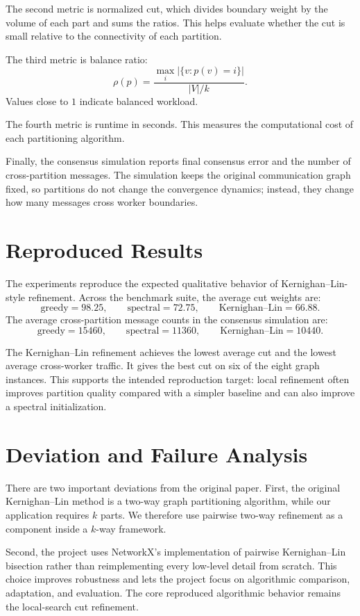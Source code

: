 \documentclass[11pt]{article}
\begin{document}
The second metric is normalized cut, which divides boundary weight by the
volume of each part and sums the ratios. This helps evaluate whether the cut is
small relative to the connectivity of each partition.

The third metric is balance ratio:
\[
    \rho(p)=
    \frac{\max_i |\{v:p(v)=i\}|}{|V|/k}.
\]
Values close to $1$ indicate balanced workload.

The fourth metric is runtime in seconds. This measures the computational cost
of each partitioning algorithm.

Finally, the consensus simulation reports final consensus error and the number
of cross-partition messages. The simulation keeps the original communication
graph fixed, so partitions do not change the convergence dynamics; instead,
they change how many messages cross worker boundaries.

\section{Reproduced Results}

The experiments reproduce the expected qualitative behavior of
Kernighan--Lin-style refinement. Across the benchmark suite, the average cut
weights are:
\[
    \text{greedy}=98.25,\qquad
    \text{spectral}=72.75,\qquad
    \text{Kernighan--Lin}=66.88.
\]
The average cross-partition message counts in the consensus simulation are:
\[
    \text{greedy}=15460,\qquad
    \text{spectral}=11360,\qquad
    \text{Kernighan--Lin}=10440.
\]

The Kernighan--Lin refinement achieves the lowest average cut and the lowest
average cross-worker traffic. It gives the best cut on six of the eight graph
instances. This supports the intended reproduction target: local refinement
often improves partition quality compared with a simpler baseline and can also
improve a spectral initialization.

\section{Deviation and Failure Analysis}

There are two important deviations from the original paper. First, the
original Kernighan--Lin method is a two-way graph partitioning algorithm, while
our application requires $k$ parts. We therefore use pairwise two-way
refinement as a component inside a $k$-way framework.

Second, the project uses NetworkX's implementation of pairwise
Kernighan--Lin bisection rather than reimplementing every low-level detail
from scratch. This choice improves robustness and lets the project focus on
algorithmic comparison, adaptation, and evaluation. The core reproduced
algorithmic behavior remains the local-search cut refinement.
\end{document}
